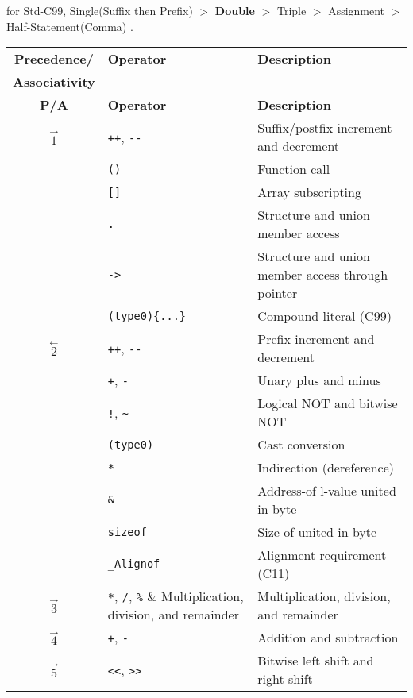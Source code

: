 
for Std-C99, Single(Suffix then Prefix) $>$ \textbf{Double} $>$ Triple $>$ Assignment $>$ Half-Statement(Comma) .


\begin{center}\begin{longtable}{|c|l|l|}
	\hline
	\textbf{Precedence/} & \textbf{Operator} & \textbf{Description} \\
	\textbf{Associativity} & \textbf{} & \textbf{} \\
	\hline
	\endfirsthead
	\hline
	\textbf{P/A} & \textbf{Operator} & \textbf{Description} \\
	\hline
	\endhead
	\hline
	\endfoot
	\hline
	\endlastfoot
	$\mathop{1}\limits ^{\rightarrow}$ 
	& \verb|++|, \verb|--| & Suffix/postfix increment and decrement \\
	\cline{2-3}
	& \verb|()| & Function call \\
	\cline{2-3}
	& \verb|[]| & Array subscripting \\
	\cline{2-3}
	& \verb|.| & Structure and union member access \\
	\cline{2-3}
	& \verb|->| & Structure and union member access through pointer \\
	\cline{2-3}
	& \verb|(type0){...}| & Compound literal (C99) \\
	\hline
	$\mathop{2}\limits ^{\leftarrow}$ 
	& \verb|++|, \verb|--| & Prefix increment and decrement \\
	\cline{2-3}
	& \verb|+|, \verb|-| & Unary plus and minus \\
	\cline{2-3}
	& \verb|!|, \verb|~| & Logical NOT and bitwise NOT \\
	\cline{2-3}
	& \verb|(type0)| & Cast conversion \\
	\cline{2-3}
	& \verb|*| & Indirection (dereference) \\
	\cline{2-3}
	& \verb|&| & Address-of l-value united in byte\\
	\cline{2-3}
	& \verb|sizeof| & Size-of united in byte\\
	\cline{2-3}
	& \verb|_Alignof| & Alignment requirement (C11) \\
	\hline
	$\mathop{3}\limits ^{\rightarrow}$ & \verb|*|, \verb|/|, \verb|%| & Multiplication, division, and remainder \\
	\hline
	$\mathop{4}\limits ^{\rightarrow}$ & \verb|+|, \verb|-| & Addition and subtraction \\
	\hline
	$\mathop{5}\limits ^{\rightarrow}$ & \verb|<<|, \verb|>>| & Bitwise left shift and right shift \\

\end{longtable}
\end{center}
